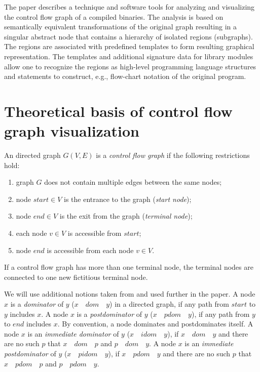 \documentclass[conference]{IEEEtran}
\begin{document}
The paper describes a technique and software tools for analyzing and visualizing the control flow graph of a compiled binaries.  The analysis is based on semantically equivalent transformations of the original graph resulting in a singular abstract node that contains a hierarchy of isolated regions (subgraphs).  The regions are associated with predefined templates to form resulting graphical representation.  The templates and additional signature data for library modules allow one to recognize the regions as high-level programming language structures and statements to construct, e.g., flow-chart notation of the original program.\enlargethispage{-2.5em}

\section{Theoretical basis of control flow\\ graph visualization}

An directed graph $G(V,E)$ is a \emph{control flow graph} if the following restrictions hold:
\begin{enumerate}
\item graph $G$ does not contain multiple edges between the same nodes;
\item node $start\in V$ is the entrance to the graph (\emph{start node});
\item node $end \in V$ is the exit from the graph (\emph{terminal node});
\item each node $v \in V$ is accessible from $start$;
\item node $end$ is accessible from each node $v \in V$.
\end{enumerate}
If a control flow graph has more than one terminal node, the terminal nodes are connected to one new fictitious terminal node.

We will use additional notions taken from \cite{sese} and used further in the paper.  A node $x$ is a \emph{dominator} of $y$ ($x\quad dom\quad y$) in a directed graph, if any path from $start$ to $y$ includes $x$.  A node $x$ is a \emph{postdominator} of $y$ ($x\quad pdom\quad y$), if any path from $y$ to $end$ includes $x$.  By convention, a node dominates and postdominates itself.  A node $x$ is an \emph{immediate dominator} of $y$ ($x\quad idom\quad y$), if $x\quad dom\quad y$ and there are no such $p$ that $x\quad dom\quad p$ and $p\quad dom\quad y$.  A node $x$ is an \emph{immediate postdominator} of $y$ ($x\quad pidom\quad y$), if $x\quad pdom\quad y$ and there are no such $p$ that $x\quad pdom\quad p$ and $p\quad pdom\quad y$.
\end{document}
